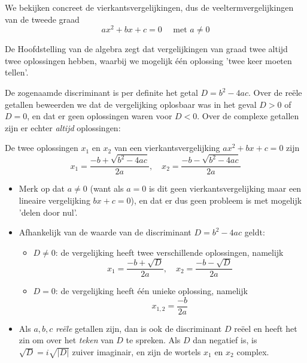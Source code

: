 \documentclass{ximera}
\begin{document}
We bekijken concreet de vierkantsvergelijkingen, dus de veeltermvergelijkingen van de tweede graad
$$
ax^2 + bx + c = 0 \quad\text{ met } a\neq 0
$$

De Hoofdstelling van de algebra zegt dat vergelijkingen van graad twee altijd twee oplossingen hebben, waarbij we mogelijk één oplossing 'twee keer moeten tellen'.

De zogenaamde discriminant is per definite het getal $D = b^2 - 4ac$. Over de reële getallen beweerden we dat de vergelijking oplosbaar was in het geval $D > 0$ of $D = 0$, en dat er geen oplossingen waren voor $D < 0$. Over de complexe getallen zijn er echter \textit{altijd} oplossingen:


\begin{proposition}\nl
De twee oplossingen $x_1$ en $x_2$ van een vierkantsvergelijking $ax^2 + bx + c = 0$ zijn
	$$ 
	x_1 = \frac{-b + \sqrt{b^2 - 4ac}}{2a}, \quad	x_2 = \frac{-b - \sqrt{b^2 - 4ac}}{2a}
	$$
\end{proposition}

\begin{remark} \nl
\begin{itemize}
\item Merk op dat $a\neq 0$ (want als $a=0$ is dit geen vierkantsvergelijking maar een lineaire vergelijking $bx+c=0$), en dat er dus geen probleem is met mogelijk 'delen door nul'.

\item Afhankelijk van de waarde van de discriminant  $D = b^2 - 4ac$  geldt:
\begin{itemize}
	\item $D \neq 0$: de vergelijking heeft twee verschillende oplossingen, namelijk
	$$ 
	x_1 = \frac{-b + \sqrt{D}}{2a}, \quad	x_2 = \frac{-b - \sqrt{D}}{2a}
	$$
	\item $D = 0$: de vergelijking heeft één unieke oplossing, namelijk
	$$
	x_{1,2} = \frac{-b}{2a}
	$$
\end{itemize}
\item Als $a,b,c$ \textit{reële} getallen zijn, dan is ook de discriminant $D$ reëel en heeft het zin om over het \textit{teken} van $D$ te spreken. Als $D$ dan negatief is, is $\sqrt{D} = i\sqrt{|D|}$ zuiver imaginair, en zijn de wortels $x_1$ en $x_2$ complex.
\end{itemize}
\end{remark}
\end{document}
